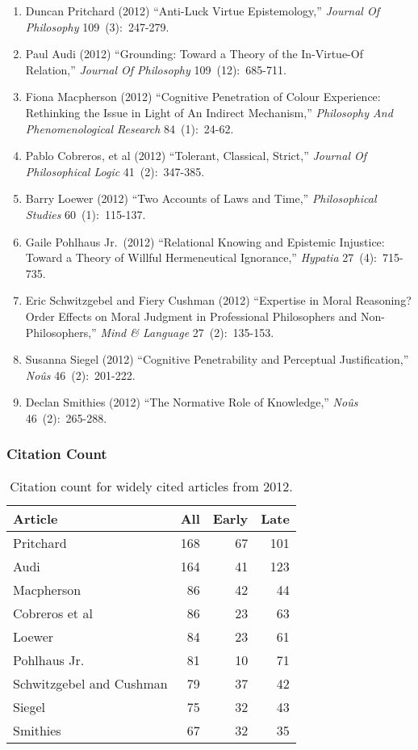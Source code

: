 \documentclass[
  10pt,
  letterpaper,
  DIV=11,
  numbers=noendperiod,
  twoside]{scrartcl}
\providecommand{\tightlist}{%
  \setlength{\itemsep}{0pt}\setlength{\parskip}{0pt}}\usepackage{longtable,booktabs,array}
\begin{document}
\begin{enumerate}
\def\labelenumi{\arabic{enumi}.}
\tightlist
\item
  Duncan Pritchard (2012) ``Anti-Luck Virtue Epistemology,''
  \emph{Journal Of Philosophy} 109~(3):~247-279.
\item
  Paul Audi (2012) ``Grounding: Toward a Theory of the In-Virtue-Of
  Relation,'' \emph{Journal Of Philosophy} 109~(12):~685-711.
\item
  Fiona Macpherson (2012) ``Cognitive Penetration of Colour Experience:
  Rethinking the Issue in Light of An Indirect Mechanism,''
  \emph{Philosophy And Phenomenological Research} 84~(1):~24-62.
\item
  Pablo Cobreros, et al (2012) ``Tolerant, Classical, Strict,''
  \emph{Journal Of Philosophical Logic} 41~(2):~347-385.
\item
  Barry Loewer (2012) ``Two Accounts of Laws and Time,''
  \emph{Philosophical Studies} 60~(1):~115-137.
\item
  Gaile Pohlhaus Jr.~(2012) ``Relational Knowing and Epistemic
  Injustice: Toward a Theory of Willful Hermeneutical Ignorance,''
  \emph{Hypatia} 27~(4):~715-735.
\item
  Eric Schwitzgebel and Fiery Cushman (2012) ``Expertise in Moral
  Reasoning? Order Effects on Moral Judgment in Professional
  Philosophers and Non-Philosophers,'' \emph{Mind \& Language}
  27~(2):~135-153.
\item
  Susanna Siegel (2012) ``Cognitive Penetrability and Perceptual
  Justification,'' \emph{Noûs} 46~(2):~201-222.
\item
  Declan Smithies (2012) ``The Normative Role of Knowledge,''
  \emph{Noûs} 46~(2):~265-288.
\end{enumerate}

\subsubsection*{Citation Count}\label{sec-count-2012}

\begin{longtable}[]{@{}lrrr@{}}

\caption{\label{tbl-citation-count-2012}Citation count for widely cited
articles from 2012.}

\tabularnewline

\toprule\noalign{}
Article & All & Early & Late \\
\midrule\noalign{}
\endhead
\bottomrule\noalign{}
\endlastfoot
Pritchard & 168 & 67 & 101 \\
Audi & 164 & 41 & 123 \\
Macpherson & 86 & 42 & 44 \\
Cobreros et al & 86 & 23 & 63 \\
Loewer & 84 & 23 & 61 \\
Pohlhaus Jr. & 81 & 10 & 71 \\
Schwitzgebel and Cushman & 79 & 37 & 42 \\
Siegel & 75 & 32 & 43 \\
Smithies & 67 & 32 & 35 \\

\end{longtable}
\end{document}
